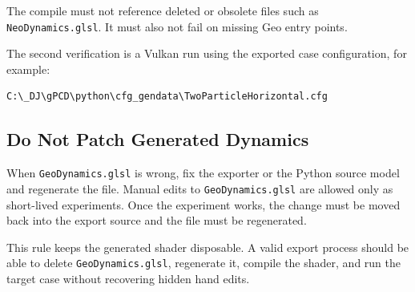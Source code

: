 The compile must not reference deleted or obsolete files such as
\texttt{NeoDynamics.glsl}.  It must also not fail on missing Geo entry points.

The second verification is a Vulkan run using the exported case configuration,
for example:

\begin{verbatim}
C:\_DJ\gPCD\python\cfg_gendata\TwoParticleHorizontal.cfg
\end{verbatim}

\subsection{Do Not Patch Generated Dynamics}

When \texttt{GeoDynamics.glsl} is wrong, fix the exporter or the Python source
model and regenerate the file.  Manual edits to \texttt{GeoDynamics.glsl} are
allowed only as short-lived experiments.  Once the experiment works, the change
must be moved back into the export source and the file must be regenerated.

This rule keeps the generated shader disposable.  A valid export process should
be able to delete \texttt{GeoDynamics.glsl}, regenerate it, compile the shader,
and run the target case without recovering hidden hand edits.
